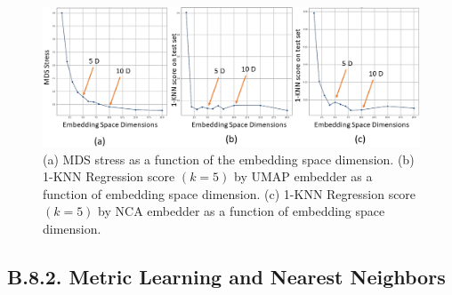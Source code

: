 \documentclass[11pt, a4paper, twoside]{article} %
\begin{document}
\begin{figure}[h!] 
     \centering 
    \includegraphics[width=0.9\linewidth]{dim.PNG}
    \caption{(a) MDS stress as a function of the embedding space dimension. (b)  1-KNN Regression score $(k=5)$ by UMAP embedder as a function of embedding space dimension. (c)  1-KNN Regression score $(k=5)$ by NCA embedder as a function of embedding space dimension. }
        \label{fig:dimension}
\end{figure}

\vspace{-0.25cm}

\subsection*{B.8.2. Metric Learning and Nearest Neighbors}
\end{document}
